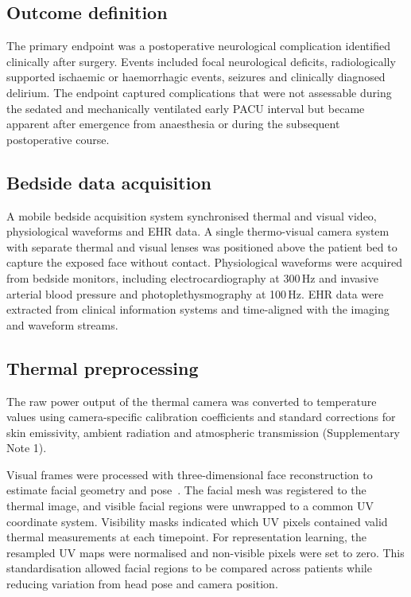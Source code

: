 \documentclass[11pt]{article}
\begin{document}
\subsection*{Outcome definition}

The primary endpoint was a postoperative neurological complication identified clinically after surgery. Events included focal neurological deficits, radiologically supported ischaemic or haemorrhagic events, seizures and clinically diagnosed delirium. The endpoint captured complications that were not assessable during the sedated and mechanically ventilated early PACU interval but became apparent after emergence from anaesthesia or during the subsequent postoperative course.

\subsection*{Bedside data acquisition}

A mobile bedside acquisition system synchronised thermal and visual video, physiological waveforms and EHR data. A single thermo-visual camera system with separate thermal and visual lenses was positioned above the patient bed to capture the exposed face without contact. Physiological waveforms were acquired from bedside monitors, including electrocardiography at 300\,Hz and invasive arterial blood pressure and photoplethysmography at 100\,Hz. EHR data were extracted from clinical information systems and time-aligned with the imaging and waveform streams.

\subsection*{Thermal preprocessing}

The raw power output of the thermal camera was converted to temperature values using camera-specific calibration coefficients and standard corrections for skin emissivity, ambient radiation and atmospheric transmission (Supplementary Note 1).

Visual frames were processed with three-dimensional face reconstruction to estimate facial geometry and pose~\citep{Deng_2020_CVPR, guo2020towards}. The facial mesh was registered to the thermal image, and visible facial regions were unwrapped to a common UV coordinate system. Visibility masks indicated which UV pixels contained valid thermal measurements at each timepoint. For representation learning, the resampled UV maps were normalised and non-visible pixels were set to zero. This standardisation allowed facial regions to be compared across patients while reducing variation from head pose and camera position.
\end{document}
